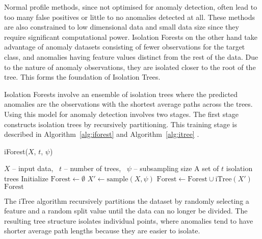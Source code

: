 \documentclass[10pt, conference]{IEEEtran}
\begin{document}
Normal profile methods, since not optimised for anomaly detection, often lead to too many false positives or little to no anomalies detected at all. These methods are also constrained to low dimensional data and small data size since they require significant computational power. Isolation Forests on the other hand take advantage of anomaly datasets consisting of fewer observations for the target class, and anomalies having feature values distinct from the rest of the data. Due to the nature of anomaly observations, they are isolated closer to the root of the tree. This forms the foundation of Isolation Trees.

Isolation Forests involve an ensemble of isolation trees where the predicted anomalies are the observations with the shortest average paths across the trees. Using this model for anomaly detection involves two stages. The first stage constructs isolation trees by recursively partitioning. This training stage is described in Algorithm~\ref{alg:iforest} and Algorithm~\ref{alg:itree} \cite{iforest2}.

\begin{algorithm}[H]
	\caption{iForest($X$, $t$, $\psi$)}
	\label{alg:iforest}
	\begin{algorithmic}[1]
		\Require $X$ -- input data, \ $t$ -- number of trees, \ $\psi$ -- subsampling size
		\Ensure A set of $t$ isolation trees
		\State Initialize $\text{Forest} \gets \emptyset$
		\State $X' \gets \text{sample}(X, \psi)$
		\State $\text{Forest} \gets \text{Forest} \cup \text{iTree}(X')$
		\EndFor \\
		\Return $\text{Forest}$
	\end{algorithmic}
\end{algorithm}

The iTree algorithm recursively partitions the dataset by randomly selecting a feature and a random split value until the data can no longer be divided. The resulting tree structure isolates individual points, where anomalies tend to have shorter average path lengths because they are easier to isolate.
\end{document}
